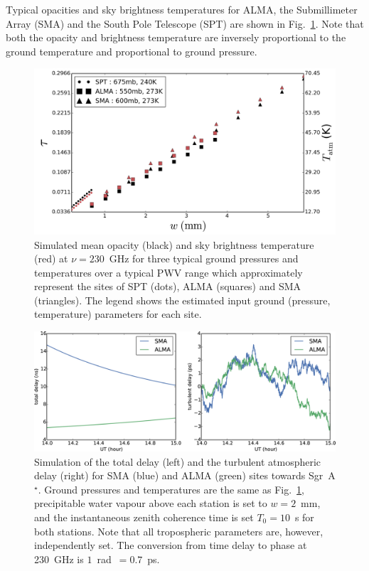 Typical opacities and sky brightness temperatures for ALMA, the Submillimeter Array (SMA) and the South Pole Telescope (SPT)  are shown in Fig.~\ref{fig:mean_atm}.  Note that both the opacity and brightness temperature are inversely proportional to the ground temperature and proportional to ground pressure.

\begin{figure}
\begin{center}
\includegraphics[width=1.\columnwidth]{Images/opacity}
\caption{Simulated mean opacity (black) and sky brightness temperature (red) at $\nu =230$~GHz  for three typical ground pressures and temperatures over a typical PWV range \citep{Lane_1998} which approximately represent the sites of SPT (dots), ALMA (squares) and SMA (triangles). The legend shows the estimated input ground (pressure, temperature) parameters for each site.\label{fig:mean_atm}%
}
\end{center}
\end{figure}


\begin{figure}
\begin{center}
\includegraphics[width=\columnwidth]{Images/delays}
\caption{Simulation of the total delay (left) and the turbulent atmospheric delay (right) for SMA (blue) and ALMA (green) sites towards Sgr~A$^\star$. Ground pressures and temperatures are the same as Fig.~\ref{fig:mean_atm}, precipitable water vapour above each station is set to $w=2$~mm, and the instantaneous zenith coherence time is set $T_0=10$~s for both stations. Note that all tropospheric parameters are, however, independently set. The conversion from time delay to phase at 230~GHz is $1$~rad~$=0.7$~ps.\label{delay_plots}%
}
\end{center}
\end{figure}


